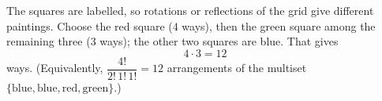 The squares are labelled, so rotations or reflections of the grid give different paintings. Choose the red square ($4$ ways), then the green square among the remaining three ($3$ ways); the other two squares are blue. That gives
\[
4\cdot3=\boxed{12}
\]
ways. (Equivalently, $\dfrac{4!}{2!\,1!\,1!}=12$ arrangements of the multiset $\{\text{blue},\text{blue},\text{red},\text{green}\}$.)
